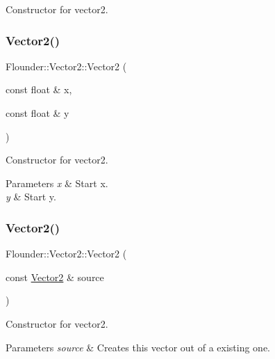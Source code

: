 Constructor for vector2. 

\mbox{\label{class_flounder_1_1_vector2_a0fa49fc940bdbcf5fb232bdaf2649cc4}} 
\subsubsection{\texorpdfstring{Vector2()}{Vector2()}\hspace{0.1cm}{\footnotesize\ttfamily [2/4]}}
{\footnotesize\ttfamily Flounder\+::\+Vector2\+::\+Vector2 (\begin{DoxyParamCaption}\item[{const float \&}]{x,  }\item[{const float \&}]{y }\end{DoxyParamCaption})}



Constructor for vector2. 


\begin{DoxyParams}{Parameters}
{\em x} & Start x. \\
\hline
{\em y} & Start y. \\
\hline
\end{DoxyParams}
\mbox{\label{class_flounder_1_1_vector2_a93de8b6b7ca4a3425bd48ba35a812390}} 
\subsubsection{\texorpdfstring{Vector2()}{Vector2()}\hspace{0.1cm}{\footnotesize\ttfamily [3/4]}}
{\footnotesize\ttfamily Flounder\+::\+Vector2\+::\+Vector2 (\begin{DoxyParamCaption}\item[{const \hyperlink{class_flounder_1_1_vector2}{Vector2} \&}]{source }\end{DoxyParamCaption})}



Constructor for vector2. 


\begin{DoxyParams}{Parameters}
{\em source} & Creates this vector out of a existing one. \\
\hline
\end{DoxyParams}
\mbox{\label{class_flounder_1_1_vector2_aa165ee95f958a45c9d8a6cfb9143b047}} 
